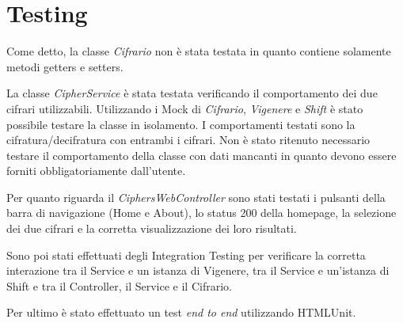 \documentclass[12pt]{article}
\begin{document}
\section{Testing}
	Come detto, la classe \emph{Cifrario} non è stata testata in quanto contiene solamente metodi getters e setters.
	
	La classe \emph{CipherService} è stata testata verificando il comportamento dei due cifrari utilizzabili. Utilizzando i Mock di \emph{Cifrario}, \emph{Vigenere} e \emph{Shift} è stato possibile testare la classe in isolamento. I comportamenti testati sono la cifratura/decifratura con entrambi i cifrari. Non è stato ritenuto necessario testare il comportamento della classe con dati mancanti in quanto devono essere forniti obbligatoriamente dall'utente.
	
	Per quanto riguarda il \emph{CiphersWebController} sono stati testati i pulsanti della barra di navigazione (Home e About), lo status 200 della homepage, la selezione dei due cifrari e la corretta visualizzazione dei loro risultati.
	
	Sono poi stati effettuati degli Integration Testing per verificare la corretta interazione tra il Service e un istanza di Vigenere, tra il Service e un'istanza di Shift e tra il Controller, il Service e il Cifrario.
	
	Per ultimo è stato effettuato un test \emph{end to end} utilizzando HTMLUnit.
\end{document}
